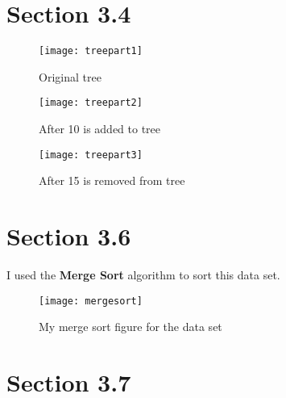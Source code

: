 \documentclass[11pt]{article}
\begin{document}
\section*{Section 3.4}
\begin{figure}[h]
    \centering
    \texttt{[image: treepart1]}
    \caption{Original tree}
    \label{fig:my_label}
\end{figure}

\begin{figure}[h]
    \centering
    \texttt{[image: treepart2]}
    \caption{After 10 is added to tree}
    \label{fig:my_label}
\end{figure}

\begin{figure}[h]
    \centering
    \texttt{[image: treepart3]}
    \caption{After 15 is removed from tree}
    \label{fig:my_label}
\end{figure}


\section*{Section 3.6}
I used the \textbf{Merge Sort} algorithm to sort this data set.
\begin{figure}
    \centering
    \texttt{[image: mergesort]}
    \caption{My merge sort figure for the data set}
    \label{fig:my_label}
\end{figure}

\section*{Section 3.7}
\end{document}
